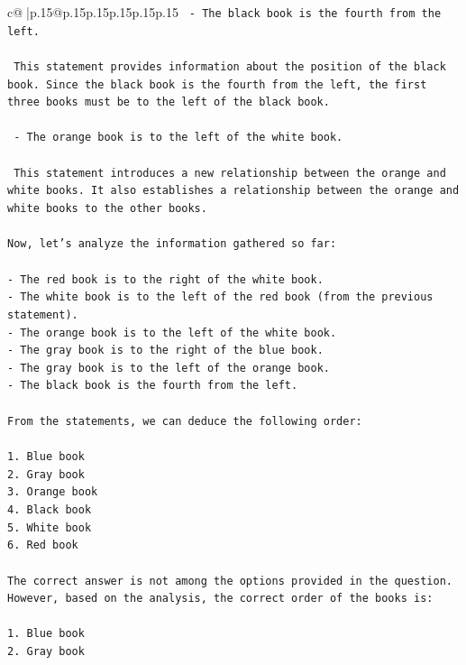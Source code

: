 \documentclass{article}
\begin{document}
{\begin{supertabular}{c@{$\;$}|p{.15\linewidth}@{}p{.15\linewidth}p{.15\linewidth}p{.15\linewidth}p{.15\linewidth}p{.15\linewidth}}
{{{\texttt{   {-} The black book is the fourth from the left.} \\
\\ 
\texttt{   This statement provides information about the position of the black book. Since the black book is the fourth from the left, the first three books must be to the left of the black book.} \\
\\ 
\texttt{   {-} The orange book is to the left of the white book.} \\
\\ 
\texttt{   This statement introduces a new relationship between the orange and white books. It also establishes a relationship between the orange and white books to the other books.} \\
\\ 
\texttt{Now, let's analyze the information gathered so far:} \\
\\ 
\texttt{{-} The red book is to the right of the white book.} \\
\texttt{{-} The white book is to the left of the red book (from the previous statement).} \\
\texttt{{-} The orange book is to the left of the white book.} \\
\texttt{{-} The gray book is to the right of the blue book.} \\
\texttt{{-} The gray book is to the left of the orange book.} \\
\texttt{{-} The black book is the fourth from the left.} \\
\\ 
\texttt{From the statements, we can deduce the following order:} \\
\\ 
\texttt{1. Blue book} \\
\texttt{2. Gray book} \\
\texttt{3. Orange book} \\
\texttt{4. Black book} \\
\texttt{5. White book} \\
\texttt{6. Red book} \\
\\ 
\texttt{The correct answer is not among the options provided in the question. However, based on the analysis, the correct order of the books is:} \\
\\ 
\texttt{1. Blue book} \\
\texttt{2. Gray book} \\
}}}
\end{supertabular}}
\end{document}

